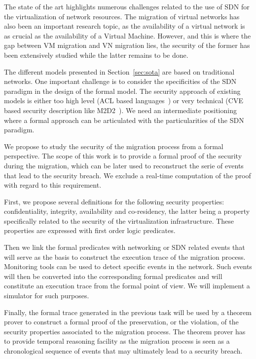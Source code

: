 The state of the art highlights numerous challenges related to the use of SDN for the virtualization of network resources.
The migration of virtual networks has also been an important research topic, as the availability of a virtual network is as crucial as the availability of a Virtual Machine.
However, and this is where the gap between VM migration and VN migration lies, the security of the former has been extensively studied while the latter remains to be done.

The different models presented in Section~\ref{sec:sota} are based on traditional networks.
One important challenge is to consider the specificities of the SDN paradigm in the design of the formal model.
The security approach of existing models is either too high level (ACL based languages~\cite{orbac,mulval-Ou2013}) or very technical (CVE based security description like M2D2~\cite{M2D2-Morin2002}).
We need an intermediate positioning where a formal approach can be articulated with the particularities of the SDN paradigm.

We propose to study the security of the migration process from a formal perspective.
The scope of this work is to provide a formal proof of the security during the migration, which can be later used to reconstruct the serie of events that lead to the security breach. We exclude a real-time computation of the proof with regard to this requirement.

First, we propose several definitions for the following security properties: confidentiality, integrity, availability 
and co-residency, the latter being a property specifically related to the security of the virtualization infrastructure.
These properties are expressed with first order logic predicates.

Then we link the formal predicates with networking or SDN related events that will serve as the basis to construct the execution trace of the migration process.
Monitoring tools can be used to detect specific events in the network. Such events will then be converted into the corresponding formal predicates and will constitute an execution trace from the formal point of view.
We will implement a simulator for such purposes.

Finally, the formal trace generated in the previous task will be used by a theorem prover to construct a formal proof of the preservation, or the violation, of the security properties associated to the migration process. The theorem prover has to provide temporal reasoning facility as the migration process is seen as a chronological sequence of events that may ultimately lead to a security breach.
